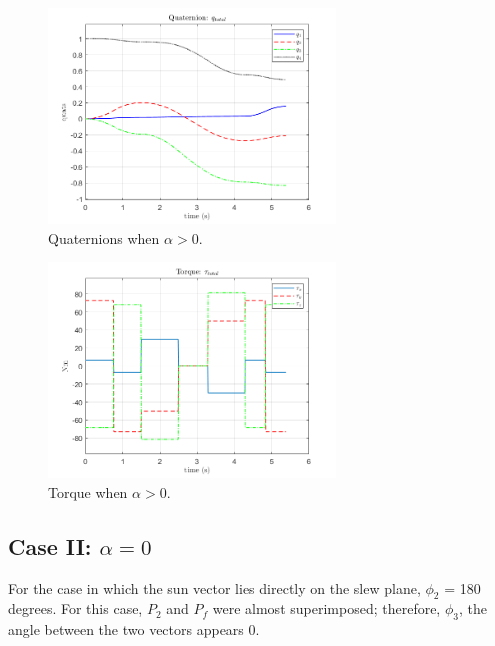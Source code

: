 \documentclass[letterpaper, preprint, paper,11pt]{AAS}	%
\begin{document}
	\begin{multicols}{2}
		\begin{figure}[H]
			\begin{center}
			\includegraphics[width=3in]{figures/alphaNot0/quats_phi_total.png}
			\caption{Quaternions when $\alpha>0$.}
			\end{center}
		\label{fig:quats_phi_total}
		\end{figure}
	\columnbreak
		\begin{figure}[H]
			\begin{center}
			\includegraphics[width=3in]{figures/alphaNot0/torque_total.png}
			\end{center}
			\caption{Torque when $\alpha>0$.}
			\label{fig:torque_total}
		\end{figure}
	\end{multicols}
			
\subsection{Case II: $\alpha = 0$} 
			
For the case in which the sun vector lies directly on the slew plane, $\phi_2$ = 180 degrees. For this case, $P_2$ and $P_f$ were almost superimposed; therefore, $\phi_3$, the angle between the two vectors appears 0. 
			
\end{document}
